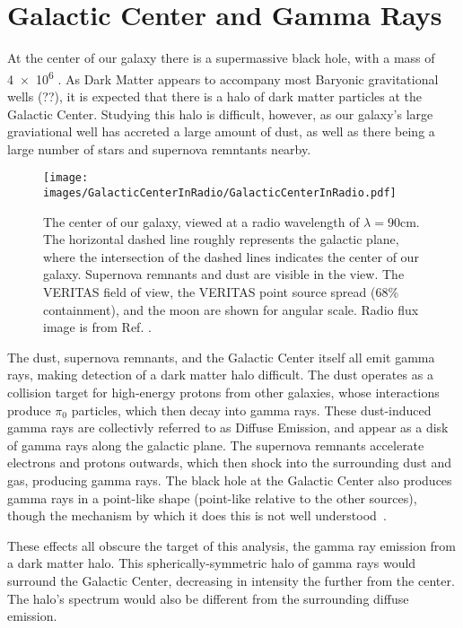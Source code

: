 \section{Galactic Center and Gamma Rays}

  At the center of our galaxy there is a supermassive black hole, with a mass of \SI{4e6}{\Msol{}} \cite{sgra_massdist}.
  As Dark Matter appears to accompany most Baryonic gravitational wells {\color{red}(??)}, it is expected that there is a halo of dark matter particles at the Galactic Center.
  Studying this halo is difficult, however, as our galaxy's large graviational well has accreted a large amount of dust, as well as there being a large number of stars and supernova remntants nearby.

  \begin{figure}[ht]
    \centering
    \texttt{[image: images/GalacticCenterInRadio/GalacticCenterInRadio.pdf]}
    \caption[Galactic Center in Radio]{
      The center of our galaxy, viewed at a radio wavelength of $\lambda=90\text{cm}$.
      The horizontal dashed line roughly represents the galactic plane, where the intersection of the dashed lines indicates the center of our galaxy.
      Supernova remnants and dust are visible in the view.
      The VERITAS field of view, the VERITAS point source spread (68\% containment), and the moon are shown for angular scale.
      Radio flux image is from Ref. \cite{galactic_center_in_radio}.}
    \label{fig_gc_radio}
  \end{figure}

  The dust, supernova remnants, and the Galactic Center itself all emit gamma rays, making detection of a dark matter halo difficult.
  The dust operates as a collision target for high-energy protons from other galaxies, whose interactions produce $\pi_0$ particles, which then decay into gamma rays.
  These dust-induced gamma rays are collectivly referred to as Diffuse Emission, and appear as a disk of gamma rays along the galactic plane.
  The supernova remnants accelerate electrons and protons outwards, which then shock into the surrounding dust and gas, producing gamma rays.
  The black hole at the Galactic Center also produces gamma rays in a point-like shape (point-like relative to the other sources), though the mechanism by which it does this is not well understood~\cite{gal_cent_still_undetermined}.

  These effects all obscure the target of this analysis, the gamma ray emission from a dark matter halo.
  This spherically-symmetric halo of gamma rays would surround the Galactic Center, decreasing in intensity the further from the center.
  The halo's spectrum would also be different from the surrounding diffuse emission.

